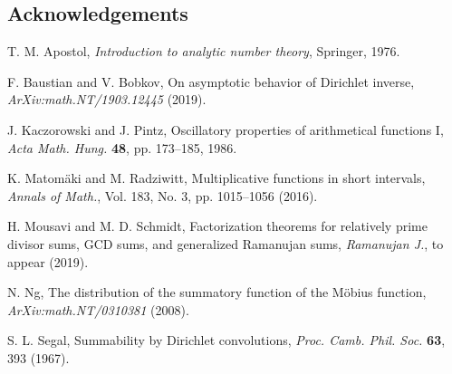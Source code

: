 \documentclass[11pt,reqno]{amsart}
\numberwithin{figure}{section}
\numberwithin{table}{section}
\theoremstyle{plain}
\numberwithin{theorem}{section}
\theoremstyle{definition}
\begin{document}
\subsection*{Acknowledgements} 


\begin{thebibliography}{10} 

T. M. Apostol, \textit{Introduction to analytic number theory}, Springer, 1976. 

F. Baustian and V. Bobkov, On asymptotic behavior of Dirichlet inverse, {\em ArXiv:math.NT/1903.12445} (2019). 

J. Kaczorowski and J. Pintz, Oscillatory properties of arithmetical 
  functions I, \emph{Acta Math. Hung.} {\bf 48}, pp. 173--185, 
  1986. 

K. Matom\"aki and M. Radziwitt, Multiplicative functions in 
  short intervals, \emph{Annals of Math.}, Vol. 183, No. 3, 
  pp. 1015--1056 (2016). 

H. Mousavi and M. D. Schmidt, Factorization theorems for relatively prime 
  divisor sums, GCD sums, and generalized {R}amanujan sums, 
  \emph{Ramanujan J.}, to appear (2019). 

N. Ng, The distribution of the summatory function of the M\"obius function, 
  \emph{ArXiv:math.NT/0310381} (2008). 

S. L. Segal, Summability by Dirichlet convolutions, 
  \emph{Proc. Camb. Phil. Soc.} \textbf{63}, 393 (1967). 

\end{thebibliography} 
\end{document}

